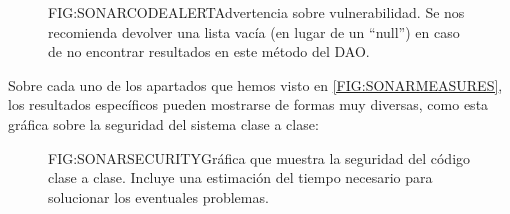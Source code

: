\begin{figure}[Sugerencia mantenimiento SonarQube]{FIG:SONARCODEALERT}{Advertencia sobre vulnerabilidad. Se nos recomienda devolver una lista vacía (en lugar de un ``null'') en caso de no encontrar resultados en este método del DAO.}
\end{figure}
\newpage
Sobre cada uno de los apartados que hemos visto en \ref{FIG:SONARMEASURES}, los resultados específicos pueden mostrarse de formas muy diversas, como esta gráfica sobre la seguridad del sistema clase a clase:

\begin{figure}[Reporte sobre seguridad de SonarQube]{FIG:SONARSECURITY}{Gráfica que muestra la seguridad del código clase a clase. Incluye una estimación del tiempo necesario para solucionar los eventuales problemas.}
\end{figure}
